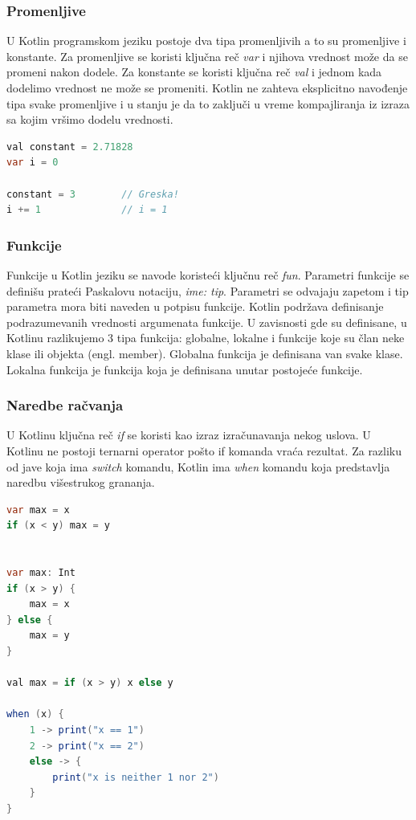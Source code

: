 \documentclass[12pt,oneside]{memoir}
\begin{document}
\subsubsection{Promenljive}
U Kotlin programskom jeziku postoje dva tipa promenljivih a to su promenljive i konstante. Za promenljive se koristi ključna reč \emph{var} i njihova vrednost može da se promeni nakon dodele. Za konstante se koristi ključna reč \emph{val} i jednom kada dodelimo vrednost ne može se promeniti. Kotlin ne zahteva eksplicitno navođenje tipa svake promenljive i u stanju je da to zaključi u vreme kompajliranja iz izraza sa kojim vršimo dodelu vrednosti.

\begin{lstlisting}[caption={Promenljive},captionpos=t, language=Java]
val constant = 2.71828
var i = 0
 
constant = 3        // Greska!
i += 1              // i = 1 
\end{lstlisting}
 
\subsubsection{Funkcije}
Funkcije u Kotlin jeziku se navode koristeći ključnu reč \emph{fun}. Parametri funkcije se definišu prateći Paskalovu notaciju, \emph{ime: tip}. Parametri se odvajaju zapetom i tip parametra mora biti naveden u potpisu funkcije. Kotlin podržava definisanje podrazumevanih vrednosti argumenata funkcije. U zavisnosti gde su definisane, u Kotlinu razlikujemo 3 tipa funkcija: globalne, lokalne i funkcije koje su član neke klase ili objekta (engl. member). Globalna funkcija je definisana van svake klase. Lokalna funkcija je funkcija koja je definisana unutar postojeće funkcije.
 
\subsubsection{Naredbe račvanja}
 
U Kotlinu ključna reč \emph{if} se koristi kao izraz izračunavanja nekog uslova. U Kotlinu ne postoji ternarni operator pošto if komanda vraća rezultat. Za razliku od jave koja ima \emph{switch} komandu, Kotlin ima \emph{when} komandu koja predstavlja naredbu višestrukog grananja.

\begin{lstlisting}[caption={Naredbe grananja},captionpos=t, language=Java]
var max = x
if (x < y) max = y
 

var max: Int
if (x > y) {
    max = x
} else {
    max = y
}
 
val max = if (x > y) x else y
 
when (x) {
    1 -> print("x == 1")
    2 -> print("x == 2")
    else -> {
        print("x is neither 1 nor 2")
    }
}
\end{lstlisting}
 
\end{document}
